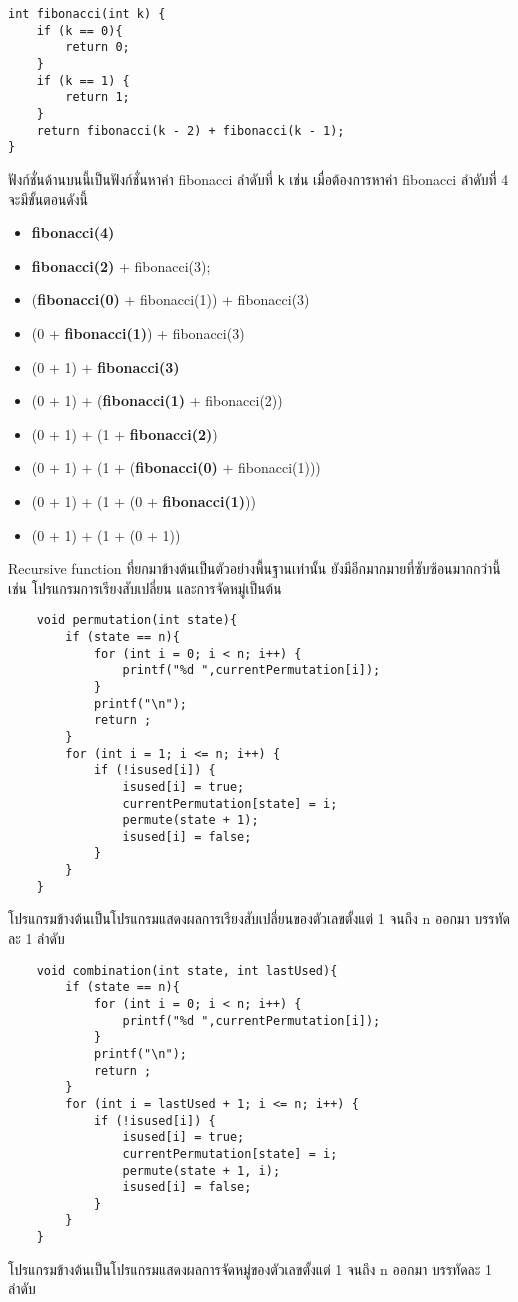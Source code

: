 \begin{lstlisting}
int fibonacci(int k) {
	if (k == 0){
    	return 0;
    }
    if (k == 1) {
    	return 1;
    }
    return fibonacci(k - 2) + fibonacci(k - 1);
}
\end{lstlisting}
ฟังก์ชั่นด้านบนนี้เป็นฟังก์ชั่นหาค่า fibonacci ลำดับที่ \texttt{k} เช่น เมื่อต้องการหาค่า fibonacci ลำดับที่ 4 จะมีขั้นตอนดังนี้
\begin{itemize}
\item \textbf{fibonacci(4)}
\item \textbf{fibonacci(2)} + fibonacci(3);
\item (\textbf{fibonacci(0)} + fibonacci(1)) + fibonacci(3)
\item (0 + \textbf{fibonacci(1)}) + fibonacci(3)
\item (0 + 1) + \textbf{fibonacci(3)}
\item (0 + 1) + (\textbf{fibonacci(1)} + fibonacci(2))
\item (0 + 1) + (1 + \textbf{fibonacci(2)})
\item (0 + 1) + (1 + (\textbf{fibonacci(0)} + fibonacci(1)))
\item (0 + 1) + (1 + (0 + \textbf{fibonacci(1)}))
\item (0 + 1) + (1 + (0 + 1))
\end{itemize}

	Recursive function ที่ยกมาข้างต้นเป็นตัวอย่างพื้นฐานเท่านั้น ยังมีอีกมากมายที่ซับซ้อนมากกว่านี้ เช่น โปรแกรมการเรียงสับเปลี่ยน และการจัดหมู่เป็นต้น
    \begin{lstlisting}
    void permutation(int state){
    	if (state == n){
        	for (int i = 0; i < n; i++) {
            	printf("%d ",currentPermutation[i]);
            }
            printf("\n");
        	return ;
        }
        for (int i = 1; i <= n; i++) {
        	if (!isused[i]) {
            	isused[i] = true;
                currentPermutation[state] = i;
                permute(state + 1);
                isused[i] = false;
            }
        }
    }
    \end{lstlisting}
    โปรแกรมข้างต้นเป็นโปรแกรมแสดงผลการเรียงสับเปลี่ยนของตัวเลขตั้งแต่ 1 จนถึง n ออกมา บรรทัดละ 1 ลำดับ
    
    \begin{lstlisting}
    void combination(int state, int lastUsed){
    	if (state == n){
        	for (int i = 0; i < n; i++) {
            	printf("%d ",currentPermutation[i]);
            }
            printf("\n");
        	return ;
        }
        for (int i = lastUsed + 1; i <= n; i++) {
        	if (!isused[i]) {
            	isused[i] = true;
                currentPermutation[state] = i;
                permute(state + 1, i);
                isused[i] = false;
            }
        }
    }
    \end{lstlisting}
    โปรแกรมข้างต้นเป็นโปรแกรมแสดงผลการจัดหมู่ของตัวเลขตั้งแต่ 1 จนถึง n ออกมา บรรทัดละ 1 ลำดับ